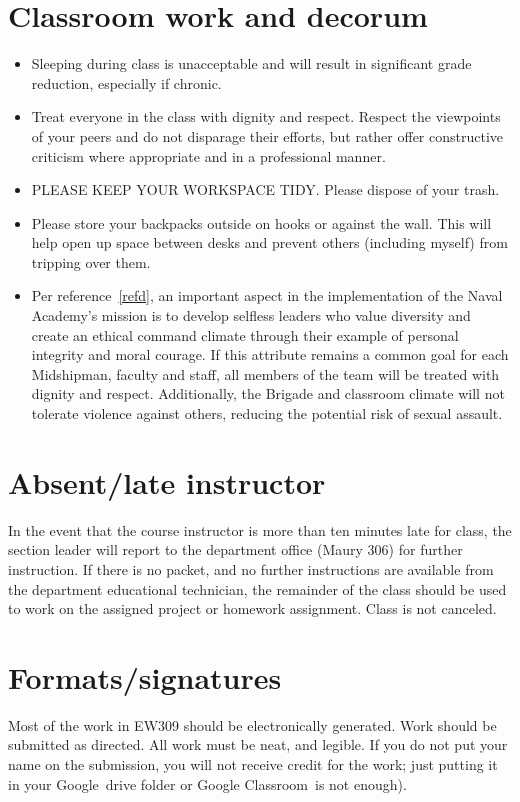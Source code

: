 \documentclass[11pt,courier]{navymemo}
\newcommand{\Google}{Google}
\newcommand{\GoogleClassroom}{Google Classroom}
\begin{document}
\section{Classroom work and decorum}
\begin{itemize}
\item Sleeping during class is unacceptable and will result in significant grade reduction, especially if chronic.
\item Treat everyone in the class with dignity and respect. Respect the viewpoints of your peers and do not disparage their efforts, but rather offer constructive criticism where appropriate and in a professional manner.
\item PLEASE KEEP YOUR WORKSPACE TIDY. Please dispose of your trash.
\item Please store your backpacks outside on hooks or against the wall. This will help open up space between desks and prevent others (including myself) from tripping over them.
\item Per reference~\ref{refd}, an important aspect in the implementation of the Naval Academy’s mission is to develop selfless leaders who value diversity and create an ethical command climate through their example of personal integrity and moral courage. If this attribute remains a common goal for each Midshipman, faculty and staff, all members of the team will be treated with dignity and respect. Additionally, the Brigade and classroom climate will not tolerate violence against others, reducing the potential risk of sexual assault.
\end{itemize}

\section{Absent/late instructor}
In the event that the course instructor is more than ten minutes late for class, the section leader will report to the department office (Maury 306) for further instruction. If there is no packet, and no further instructions are available from the department educational technician, the remainder of the class should be used to work on the assigned project or homework assignment.  Class is not canceled.
 
\section{Formats/signatures}
Most of the work in EW309 should be electronically generated. Work should be submitted as directed. All work must be neat,  and legible. If you do not put your name on the submission, you will not receive credit for the work; just putting it in your \Google\ drive folder or \GoogleClassroom\ is not enough).
 
\end{document}
